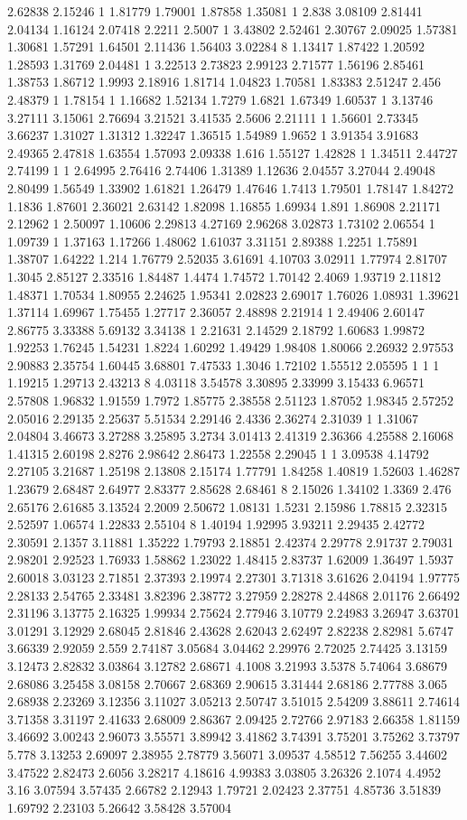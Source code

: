 2.62838 2.15246 1 1.81779 1.79001 1.87858 1.35081 1 2.838 3.08109 2.81441 2.04134 1.16124 2.07418 2.2211 2.5007 1 3.43802 2.52461 2.30767 2.09025 1.57381 1.30681 1.57291 1.64501 2.11436 1.56403 3.02284 8 1.13417 1.87422 1.20592 1.28593 1.31769 2.04481 1 3.22513 2.73823 2.99123 2.71577 1.56196 2.85461 1.38753 1.86712 1.9993 2.18916 1.81714 1.04823 1.70581 1.83383 2.51247 2.456 2.48379 1 1.78154 1 1.16682 1.52134 1.7279 1.6821 1.67349 1.60537 1 3.13746 3.27111 3.15061 2.76694 3.21521 3.41535 2.5606 2.21111 1 1.56601 2.73345 3.66237 1.31027 1.31312 1.32247 1.36515 1.54989 1.9652 1 3.91354 3.91683 2.49365 2.47818 1.63554 1.57093 2.09338 1.616 1.55127 1.42828 1 1.34511 2.44727 2.74199 1 1 2.64995 2.76416 2.74406 1.31389 1.12636 2.04557 3.27044 2.49048 2.80499 1.56549 1.33902 1.61821 1.26479 1.47646 1.7413 1.79501 1.78147 1.84272 1.1836 1.87601 2.36021 2.63142 1.82098 1.16855 1.69934 1.891 1.86908 2.21171 2.12962 1 2.50097 1.10606 2.29813 4.27169 2.96268 3.02873 1.73102 2.06554 1 1.09739 1 1.37163 1.17266 1.48062 1.61037 3.31151 2.89388 1.2251 1.75891 1.38707 1.64222 1.214 1.76779 2.52035 3.61691 4.10703 3.02911 1.77974 2.81707 1.3045 2.85127 2.33516 1.84487 1.4474 1.74572 1.70142 2.4069 1.93719 2.11812 1.48371 1.70534 1.80955 2.24625 1.95341 2.02823 2.69017 1.76026 1.08931 1.39621 1.37114 1.69967 1.75455 1.27717 2.36057 2.48898 2.21914 1 2.49406 2.60147 2.86775 3.33388 5.69132 3.34138 1 2.21631 2.14529 2.18792 1.60683 1.99872 1.92253 1.76245 1.54231 1.8224 1.60292 1.49429 1.98408 1.80066 2.26932 2.97553 2.90883 2.35754 1.60445 3.68801 7.47533 1.3046 1.72102 1.55512 2.05595 1 1 1 1.19215 1.29713 2.43213 8 4.03118 3.54578 3.30895 2.33999 3.15433 6.96571 2.57808 1.96832 1.91559 1.7972 1.85775 2.38558 2.51123 1.87052 1.98345 2.57252 2.05016 2.29135 2.25637 5.51534 2.29146 2.4336 2.36274 2.31039 1 1.31067 2.04804 3.46673 3.27288 3.25895 3.2734 3.01413 2.41319 2.36366 4.25588 2.16068 1.41315 2.60198 2.8276 2.98642 2.86473 1.22558 2.29045 1 1 3.09538 4.14792 2.27105 3.21687 1.25198 2.13808 2.15174 1.77791 1.84258 1.40819 1.52603 1.46287 1.23679 2.68487 2.64977 2.83377 2.85628 2.68461 8 2.15026 1.34102 1.3369 2.476 2.65176 2.61685 3.13524 2.2009 2.50672 1.08131 1.5231 2.15986 1.78815 2.32315 2.52597 1.06574 1.22833 2.55104 8 1.40194 1.92995 3.93211 2.29435 2.42772 2.30591 2.1357 3.11881 1.35222 1.79793 2.18851 2.42374 2.29778 2.91737 2.79031 2.98201 2.92523 1.76933 1.58862 1.23022 1.48415 2.83737 1.62009 1.36497 1.5937 2.60018 3.03123 2.71851 2.37393 2.19974 2.27301 3.71318 3.61626 2.04194 1.97775 2.28133 2.54765 2.33481 3.82396 2.38772 3.27959 2.28278 2.44868 2.01176 2.66492 2.31196 3.13775 2.16325 1.99934 2.75624 2.77946 3.10779 2.24983 3.26947 3.63701 3.01291 3.12929 2.68045 2.81846 2.43628 2.62043 2.62497 2.82238 2.82981 5.6747 3.66339 2.92059 2.559 2.74187 3.05684 3.04462 2.29976 2.72025 2.74425 3.13159 3.12473 2.82832 3.03864 3.12782 2.68671 4.1008 3.21993 3.5378 5.74064 3.68679 2.68086 3.25458 3.08158 2.70667 2.68369 2.90615 3.31444 2.68186 2.77788 3.065 2.68938 2.23269 3.12356 3.11027 3.05213 2.50747 3.51015 2.54209 3.88611 2.74614 3.71358 3.31197 2.41633 2.68009 2.86367 2.09425 2.72766 2.97183 2.66358 1.81159 3.46692 3.00243 2.96073 3.55571 3.89942 3.41862 3.74391 3.75201 3.75262 3.73797 5.778 3.13253 2.69097 2.38955 2.78779 3.56071 3.09537 4.58512 7.56255 3.44602 3.47522 2.82473 2.6056 3.28217 4.18616 4.99383 3.03805 3.26326 2.1074 4.4952 3.16 3.07594 3.57435 2.66782 2.12943 1.79721 2.02423 2.37751 4.85736 3.51839 1.69792 2.23103 5.26642 3.58428 3.57004 
